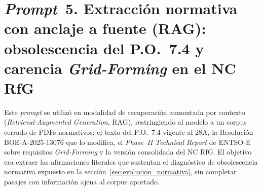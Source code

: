 \section*{\textit{Prompt}~5. Extracción normativa con anclaje a fuente
(RAG): obsolescencia del P.O.~7.4 y carencia \textit{Grid-Forming} en
el NC RfG}
\label{prompt:rag_normativa}

Este \textit{prompt} se utilizó en modalidad de recuperación aumentada
por contexto (\textit{Retrieval-Augmented Generation}, RAG), restringiendo
al modelo a un corpus cerrado de PDFs normativos: el texto del P.O.~7.4
vigente al 28A, la Resolución BOE-A-2025-13076 que lo modifica, el
\textit{Phase~II Technical Report} de ENTSO-E sobre requisitos
\textit{Grid-Forming} y la versión consolidada del NC RfG. El objetivo
era extraer las afirmaciones literales que sustentan el
diagnóstico de obsolescencia normativa expuesto en la
sección~\ref{sec:evolucion_normativa}, sin completar pasajes con
información ajena al corpus aportado.

